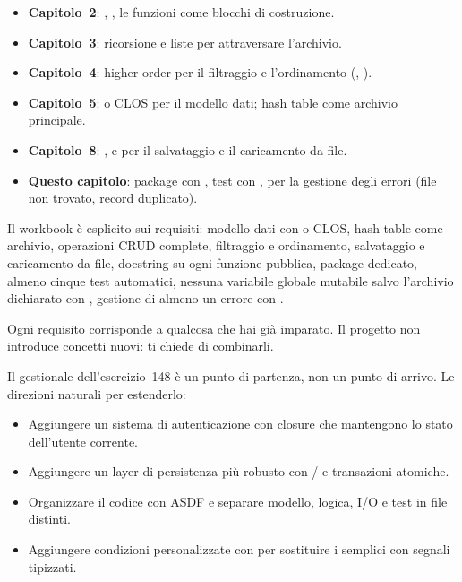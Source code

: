 \begin{itemize}
  \item \textbf{Capitolo~2}: , ,
        le funzioni come blocchi di costruzione.
  \item \textbf{Capitolo~3}: ricorsione e liste per attraversare
        l'archivio.
  \item \textbf{Capitolo~4}: higher-order per il filtraggio
        e l'ordinamento (, ).
  \item \textbf{Capitolo~5}:  o CLOS per il modello
        dati; hash table come archivio principale.
  \item \textbf{Capitolo~8}: , 
        e  per il salvataggio e il caricamento da file.
  \item \textbf{Questo capitolo}: package con ,
        test con ,  per la gestione
        degli errori (file non trovato, record duplicato).
\end{itemize}


Il workbook è esplicito sui requisiti:
modello dati con  o CLOS, hash table come archivio,
operazioni CRUD complete, filtraggio e ordinamento,
salvataggio e caricamento da file, docstring su ogni funzione pubblica,
package dedicato, almeno cinque test automatici,
nessuna variabile globale mutabile salvo l'archivio dichiarato
con , gestione di almeno un errore con .

Ogni requisito corrisponde a qualcosa che hai già imparato.
Il progetto non introduce concetti nuovi: ti chiede di combinarli.


Il gestionale dell'esercizio~148 è un punto di partenza,
non un punto di arrivo.
Le direzioni naturali per estenderlo:

\begin{itemize}
  \item Aggiungere un sistema di autenticazione con closure
        che mantengono lo stato dell'utente corrente.
  \item Aggiungere un layer di persistenza più robusto
        con / e transazioni atomiche.
  \item Organizzare il codice con ASDF e separare
        modello, logica, I/O e test in file distinti.
  \item Aggiungere condizioni personalizzate con 
        per sostituire i semplici  con segnali tipizzati.
\end{itemize}

